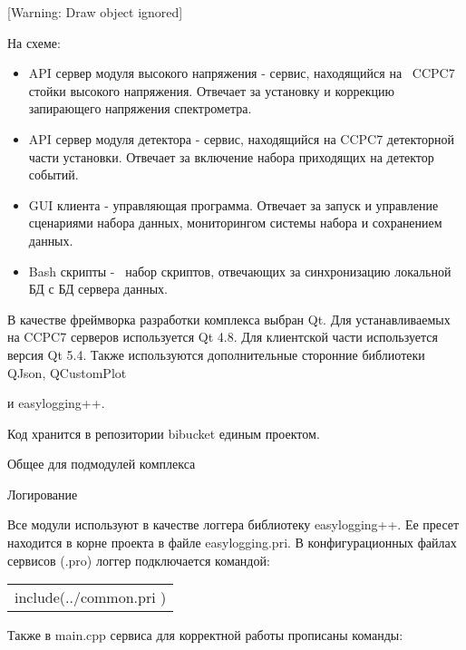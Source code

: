 \documentclass{article}
\begin{document}
[Warning: Draw object ignored]

На схеме:

\begin{itemize}
\item API сервер модуля высокого напряжения - сервис, находящийся на \ CCPC7 стойки высокого напряжения. Отвечает за установку и коррекцию запирающего напряжения спектрометра.
\item API сервер модуля детектора - сервис, находящийся на CCPC7 детекторной части установки. Отвечает за включение набора приходящих на детектор событий.
\item GUI клиента - управляющая программа. Отвечает за запуск и управление сценариями набора данных, мониторингом системы набора и сохранением данных.
\item Bash скрипты - \ набор скриптов, отвечающих за синхронизацию локальной БД с БД сервера данных.
\end{itemize}

\bigskip

В качестве фреймворка разработки комплекса выбран Qt. Для устанавливаемых на CCPC7 серверов используется Qt 4.8. Для клиентской части используется версия Qt 5.4. Также используются дополнительные сторонние библиотеки QJson, QCustomPlot

и easylogging++.


\bigskip

Код хранится в репозитории bibucket единым проектом.

Общее для подмодулей комплекса

Логирование

Все модули используют в качестве логгера библиотеку easylogging++. Ее пресет находится в корне проекта в файле easylogging.pri. В конфигурационных файлах сервисов (.pro) логгер подключается командой:

\begin{flushleft}
\tablefirsthead{}
\tablehead{}
\tabletail{}
\tablelasttail{}
\begin{supertabular}{m{6.19136in}}
include(../common.pri )\\
\end{supertabular}
\end{flushleft}
Также в main.cpp сервиса для корректной работы прописаны команды:
\end{document}
